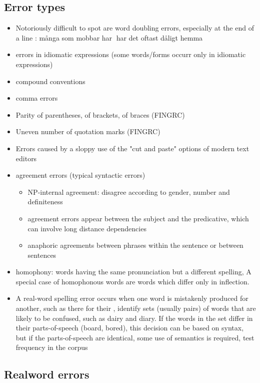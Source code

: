 \documentclass[a4paper,english,12pt]{article}
\begin{document}
\begin{spacing}{1.0}
\subsection{Error types}

\begin{itemize}
\item Notoriously difficult to spot are word doubling errors, especially at the end of a line \citet{Vosse1992}: många som mobbar har har det oftast dåligt hemma \citet[p.64]{Sofkova2003}
\item errors in idiomatic expressions (some words/forms occurr only in idiomatic expressions)
\item compound conventions
\item comma errors
\item Parity of parentheses, of brackets, of braces (FINGRC)
\item  Uneven number of quotation marks (FINGRC)
\item Errors caused by a sloppy use of the "cut and paste" options of modern text editors
\item agreement errors (typical syntactic errors) \citet{Vosse1992}
\begin{itemize}
\item NP-internal agreement: disagree according to gender, number and definiteness
\item agreement errors appear between the subject and the predicative, which can involve long distance dependencies
\item anaphoric agreements between phrases within the sentence or between sentences
\end{itemize}
\item homophony: words having the same pronunciation but a different spelling, A special case of homophonous words are words which differ only in inflection.
\item A real-word spelling error occurs when one word is mistakenly produced for another, such as there for their \citet{Pedler2005}, identify sets (usually pairs) of words that are likely to be confused, such as dairy and diary. If the words in the set differ in their parts-of-speech (board, bored), this decision can be based on syntax, but if the parts-of-speech are identical, some use of semantics is required, test frequency in the corpus
\end{itemize}

\subsection{Realword errors}


\end{spacing}
\end{document}
